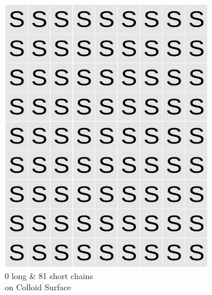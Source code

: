 \documentclass[journal=mamobx,manuscript=article]{achemso}
\begin{document}
\begin{figure}[H]
    \begin{subfigure}[b]{0.4\textwidth}
        \includegraphics[scale=0.15]{fig8a.png}
        \caption{0 long \& 81 short chains\\ on Colloid Surface}
        \label{fig:A}
    \end{subfigure}
    \begin{subfigure}[b]{0.4\textwidth}

\end{subfigure}
\end{figure}
\end{document}
